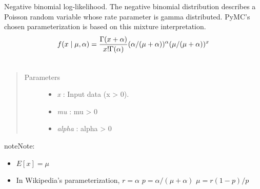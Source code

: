 \documentclass[letterpaper,10pt,english]{sphinxmanual}
\begin{document}
\begin{fulllineitems}
\label{distributions:pymc.distributions.negative_binomial_like}
Negative binomial log-likelihood. The negative binomial
distribution describes a Poisson random variable whose rate
parameter is gamma distributed. PyMC's chosen parameterization is
based on this mixture interpretation.
\begin{gather}
\begin{split}f(x \mid \mu, \alpha) = \frac{\Gamma(x+\alpha)}{x! \Gamma(\alpha)} (\alpha/(\mu+\alpha))^\alpha (\mu/(\mu+\alpha))^x\end{split}\notag\\\begin{split}\end{split}\notag
\end{gather}\begin{quote}\begin{description}
\item[{Parameters }] \leavevmode\begin{itemize}
\item {} 
\emph{x} : Input data (x \textgreater{} 0).

\item {} 
\emph{mu} : mu \textgreater{} 0

\item {} 
\emph{alpha} : alpha \textgreater{} 0

\end{itemize}

\end{description}\end{quote}

\begin{notice}{note}{Note:}\begin{itemize}
\item {} 
$E[x]=\mu$

\item {} 
In Wikipedia's parameterization,
$r=\alpha$
$p=\alpha/(\mu+\alpha)$
$\mu=r(1-p)/p$

\end{itemize}
\end{notice}

\end{fulllineitems}

\end{document}
